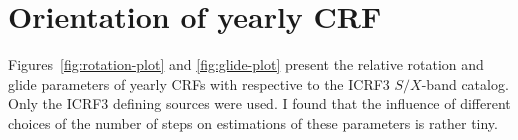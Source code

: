 \documentclass{aa-note}    %
\begin{document}
\section{Orientation of yearly CRF} \label{sec:yearly-crf}


Figures~\ref{fig:rotation-plot} and \ref{fig:glide-plot} present the relative rotation and glide parameters of yearly CRFs with respective to the ICRF3 $S/X$-band catalog.
Only the ICRF3 defining sources were used.
I found that the influence of different choices of the number of steps on estimations of these parameters is rather tiny.

\end{document}
